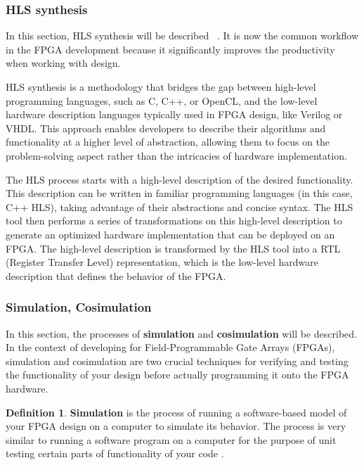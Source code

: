 \documentclass[a4paper, twoside]{report}
\theoremstyle{definition}
\newtheorem{definition}[theorem]{Definition}
\numberwithin{equation}{section}
\begin{document}
\subsubsection{HLS synthesis} \label{sec:hls_synthesis}

In this section, HLS synthesis will be described ~\cite{AMD2023VitisHLS}.
It is now the common workflow in the FPGA development because it significantly
improves the productivity when working with design.

HLS synthesis is a methodology that bridges the gap between high-level programming
languages, such as C, C++, or OpenCL, and the low-level hardware description languages
typically used in FPGA design, like Verilog or VHDL. This approach enables developers
to describe their algorithms and functionality at a higher level of abstraction,
allowing them to focus on the problem-solving aspect rather than the intricacies of hardware implementation.

The HLS process starts with a high-level description of the desired functionality.
This description can be written in familiar programming languages (in this case, C++ HLS),
taking advantage of their abstractions and concise syntax.
The HLS tool then performs a series of transformations on this high-level description to generate
an optimized hardware implementation that can be deployed on an FPGA.
The high-level description is transformed by the HLS tool into a RTL (Register Transfer Level) representation,
which is the low-level hardware description that defines the behavior of the FPGA.


\subsubsection{Simulation, Cosimulation}

In this section, the processes of \textbf{simulation} and \textbf{cosimulation} will be described.
In the context of developing for Field-Programmable Gate Arrays (FPGAs),
simulation and cosimulation are two crucial techniques for verifying and testing the
functionality of your design before actually programming it onto the FPGA hardware.

\begin{definition}
    \textbf{Simulation} is the process of running a software-based model of your FPGA design on
    a computer to simulate its behavior.
    The process is very similar to running a software program on a computer for
    the purpose of unit testing certain parts of functionality of your code
    \cite{AMD2023VitisSimCosim}.
\end{definition}
\end{document}
